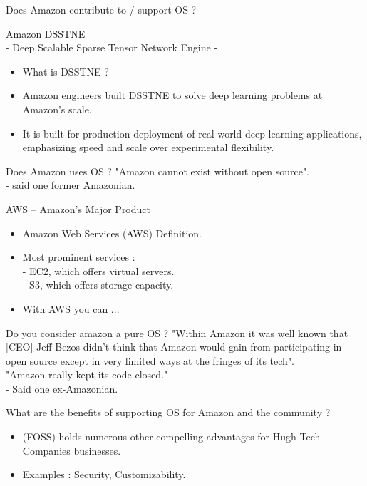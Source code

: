 \documentclass{beamer}
\begin{document}
	
	\begin{frame}{Does Amazon contribute to / support OS ?}
		
		\huge Amazon DSSTNE
		\\ \normalsize- Deep Scalable Sparse Tensor Network Engine -
		
		\begin{itemize}	
			\item What is DSSTNE ?
			\item Amazon engineers built DSSTNE to solve deep learning problems at Amazon's scale.
			\item It is built for production deployment of real-world deep learning applications, emphasizing speed and scale over experimental flexibility.
			
 		\end{itemize}
	\end{frame}

\begin{frame}{Does Amazon uses OS ?}
	\centering "Amazon \huge{cannot exist} \normalsize without open source".
	\\ - said one former Amazonian.
\end{frame}

\begin{frame}{AWS – Amazon’s Major Product}
\begin{itemize}
	
	\item Amazon Web Services (AWS) Definition.
	\item Most prominent services :
	\\ - EC2, which offers virtual servers.
	\\- S3, which offers storage capacity.
	\item With AWS you can ...
	
\end{itemize}
\end{frame}

\begin{frame}{Do you consider amazon a pure OS ?}
	\centering "Within Amazon it was well known that [CEO] Jeff Bezos didn't think that Amazon would gain from participating in open source except in very limited ways at the fringes of its tech".
	\\"Amazon really kept its code \huge{closed}\normalsize."
	\\ \normalsize - Said one ex-Amazonian. 
\end{frame}


\begin{frame}{What are the benefits of supporting OS for Amazon and the community ?}
	\begin{itemize}
		
		\item (FOSS) holds numerous other compelling advantages for Hugh Tech Companies businesses.
		\item Examples : Security, Customizability.
		
	\end{itemize} 
\end{frame}
\end{document}
